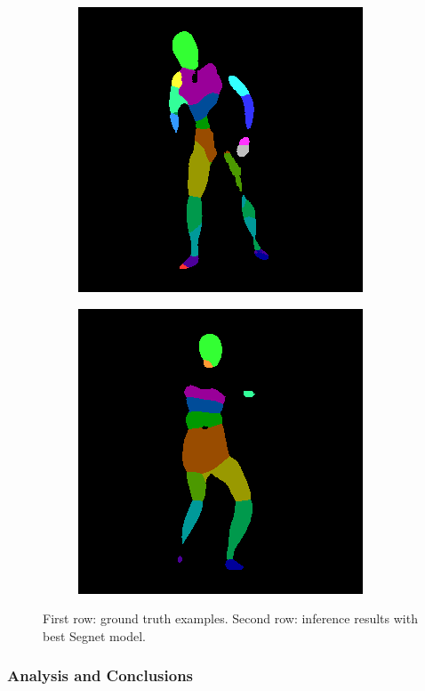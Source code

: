 \begin{figure}
\begin{subfigure}{.19\textwidth}
\end{subfigure}
\begin{subfigure}{.19\textwidth}
  \centering
  \includegraphics[scale=0.295]{104_52_c0002_segm_38_seg.png}
\end{subfigure}
\begin{subfigure}{.189\textwidth}
  \centering
  \includegraphics[scale=0.296]{ung_133_25_c0001_segm_29_seg.png}
\end{subfigure}

\caption{First row: ground truth examples. Second row: inference results with best Segnet model.}
\label{segnet:inference}
\end{figure}

\subsubsection{Analysis and Conclusions}


